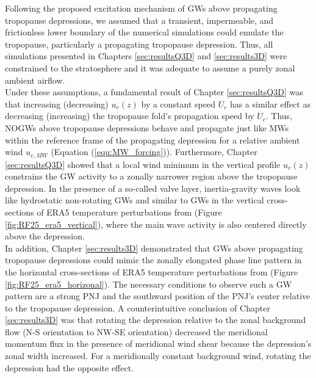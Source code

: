 Following the proposed excitation mechanism of GWs above propagating tropopause depressions, we assumed that a transient, impermeable, and frictionless lower boundary of the numerical simulations could emulate the tropopause, particularly a propagating tropopause depression. Thus, all simulations presented in Chapters \ref{sec:resultsQ3D} and \ref{sec:results3D} were constrained to the stratosphere and it was adequate to assume a purely zonal ambient airflow.\\
Under these assumptions, a fundamental result of Chapter \ref{sec:resultsQ3D} was that increasing (decreasing) $u_e(z)$ by a constant speed $U_c$ has a similar effect as decreasing (increasing) the tropopause fold's propagation speed by $U_c$. Thus, NOGWs above tropopause depressions behave and propagate just like MWs within the reference frame of the propagating depression for a relative ambient wind $u_{e,MW}$ (Equation (\ref{equ:MW_forcing})). Furthermore, Chapter \ref{sec:resultsQ3D} showed that a local wind minimum in the vertical profile $u_e(z)$ constrains the GW activity to a zonally narrower region above the tropopause depression. In the presence of a so-called valve layer, inertia-gravity waves look like hydrostatic non-rotating GWs and similar to GWs in the vertical cross-sections of ERA5 temperature perturbations from \textcite[]{dornbrack_stratospheric_2022} (Figure \ref{fig:RF25_era5_vertical}), where the main wave activity is also centered directly above the depression.\\
In addition, Chapter \ref{sec:results3D} demonstrated that GWs above propagating tropopause depressions could mimic the zonally elongated phase line pattern in the horizontal cross-sections of ERA5 temperature perturbations from \textcite[]{dornbrack_stratospheric_2022} (Figure \ref{fig:RF25_era5_horizonal}). The necessary conditions to observe such a GW pattern are a strong PNJ and the southward position of the PNJ's center relative to the tropopause depression. A counterintuitive conclusion of Chapter \ref{sec:results3D} was that rotating the depression relative to the zonal background flow (N-S orientation to NW-SE orientation) decreased the meridional momentum flux in the presence of meridional wind shear because the depression's zonal width increased. For a meridionally constant background wind, rotating the depression had the opposite effect.

